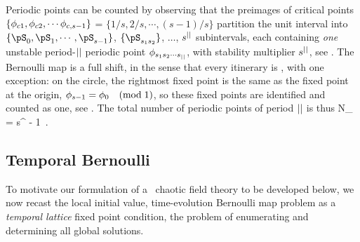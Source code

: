 Periodic points can be counted by observing that the preimages of
critical points $\{\phi_{c1},\phi_{c2},\cdots\phi_{c,s-1}\}$ =
$\{{1}/s,{2}/s,\cdots,(s-1)/s\}$ partition the unit interval into
$\{\pS_0,\pS_1,\cdots,\pS_{s-1}\}$, $\{\pS_{\Ssym{1}\Ssym{2}}\}$, $\dots$,
$s^{||}$ subintervals, each containing {\em one}  unstable
period-${||}$ periodic point
$\phi_{{s_{1}}{s_{2}}\cdots{\ensuremath{s_{{||}}}}}$, with stability multiplier
${s}^{||}$, see . The Bernoulli map is a
full shift, in the sense that every itinerary is \admissible, with one
exception: on the circle, the rightmost fixed point is the same as the
fixed point at the origin, $\phi_{s-1}=\phi_{0}\quad(\mbox{mod}\;1)$,
so these fixed points are identified and counted as one, see
. The total number of periodic points of period
${||}$ is thus
\beq
N_{\cl{}} = s^{\cl{}} - 1
\,.


\subsection{Temporal Bernoulli}
\label{s:1D1dLatt}

To motivate our formulation of a \spt\ chaotic field theory to be
developed below, we now recast the local initial value, time-evolution
Bernoulli map problem as a \emph{temporal lattice} fixed point condition,
the problem of enumerating and determining all global solutions.


